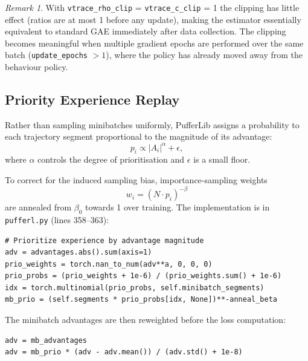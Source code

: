 \documentclass[12pt, a4paper]{article}
\theoremstyle{definition}
\theoremstyle{plain}
\theoremstyle{remark}
\newtheorem{remark}{Remark}[section]
\begin{document}
\begin{remark}
  With \texttt{vtrace\_rho\_clip} = \texttt{vtrace\_c\_clip} = 1 the clipping has
  little effect (ratios are at most 1 before any update), making the estimator
  essentially equivalent to standard GAE immediately after data collection.  The
  clipping becomes meaningful when multiple gradient epochs are performed over the
  same batch (\texttt{update\_epochs} $> 1$), where the policy has already moved away
  from the behaviour policy.
\end{remark}

\subsection{Priority Experience Replay}
\label{sec:per}

Rather than sampling minibatches uniformly, PufferLib assigns a probability to each
trajectory segment proportional to the magnitude of its advantage:
\begin{equation}
  p_i \propto |A_i|^\alpha + \epsilon,
  \label{eq:per}
\end{equation}
where $\alpha$ controls the degree of prioritisation and $\epsilon$ is a small floor.

To correct for the induced sampling bias, importance-sampling weights
\begin{equation}
  w_i = \left(N \cdot p_i\right)^{-\beta}
\end{equation}
are annealed from $\beta_0$ towards 1 over training.  The implementation is in
\texttt{pufferl.py} (lines 358--363):

\begin{lstlisting}[style=pythonstyle,
  caption={Priority sampling in \texttt{pufferlib/pufferl.py} (lines 358--363).}]
# Prioritize experience by advantage magnitude
adv = advantages.abs().sum(axis=1)
prio_weights = torch.nan_to_num(adv**a, 0, 0, 0)
prio_probs = (prio_weights + 1e-6) / (prio_weights.sum() + 1e-6)
idx = torch.multinomial(prio_probs, self.minibatch_segments)
mb_prio = (self.segments * prio_probs[idx, None])**-anneal_beta
\end{lstlisting}

The minibatch advantages are then reweighted before the loss computation:

\begin{lstlisting}[style=pythonstyle,
  caption={Priority-weighted advantage normalisation (\texttt{pufferl.py}, lines 407--409).}]
adv = mb_advantages
adv = mb_prio * (adv - adv.mean()) / (adv.std() + 1e-8)
\end{lstlisting}
\end{document}
